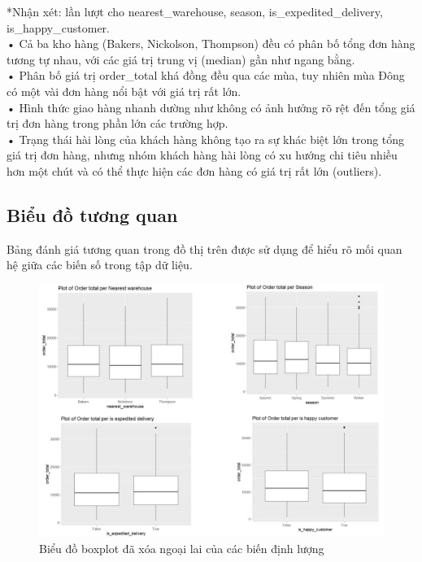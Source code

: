 *Nhận xét: lần lượt cho  nearest\_warehouse, season, is\_expedited\_delivery, is\_happy\_customer.\\
•	Cả ba kho hàng (Bakers, Nickolson, Thompson) đều có phân bố tổng đơn hàng tương tự nhau, với các giá trị trung vị (median) gần như ngang bằng.\\
•	Phân bố giá trị order\_total khá đồng đều qua các mùa, tuy nhiên mùa Đông có một vài đơn hàng nổi bật với giá trị rất lớn.\\
•	Hình thức giao hàng nhanh dường như không có ảnh hưởng rõ rệt đến tổng giá trị đơn hàng trong phần lớn các trường hợp.\\
•	Trạng thái hài lòng của khách hàng không tạo ra sự khác biệt lớn trong tổng giá trị đơn hàng, nhưng nhóm khách hàng hài lòng có xu hướng chi tiêu nhiều hơn một chút và có thể thực hiện các đơn hàng có giá trị rất lớn (outliers).
\subsection{Biểu đồ tương quan}
Bảng đánh giá tương quan trong đồ thị trên được sử dụng để hiểu rõ mối quan hệ giữa các biến số trong tập dữ liệu.
\begin{figure}[H]
    \centering
    \includegraphics[width=1\linewidth]{graphics/bang14.jpg}
    \caption{Biểu đồ boxplot đã xóa ngoại lai của các biến định lượng}
    
\end{figure}